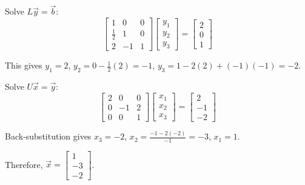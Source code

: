 \documentclass[reqno, answers]{exam}
\begin{document}
\begin{questions}
\begin{solution}
    Solve $L\vec{y} = \vec{b}$:
    $$\begin{bmatrix} 1 & 0 & 0 \\ \frac{1}{2} & 1 & 0 \\ 2 & -1 & 1 \end{bmatrix} \begin{bmatrix} y_1 \\ y_2 \\ y_3 \end{bmatrix} = \begin{bmatrix} 2 \\ 0 \\ 1 \end{bmatrix}$$
    
    This gives $y_1 = 2$, $y_2 = 0 - \frac{1}{2}(2) = -1$, $y_3 = 1 - 2(2) + (-1)(-1) = -2$.

    Solve $U\vec{x} = \vec{y}$:
    $$\begin{bmatrix} 2 & 0 & 0 \\ 0 & -1 & 2 \\ 0 & 0 & 1 \end{bmatrix} \begin{bmatrix} x_1 \\ x_2 \\ x_3 \end{bmatrix} = \begin{bmatrix} 2 \\ -1 \\ -2 \end{bmatrix}$$
    
    Back-substitution gives $x_3 = -2$, $x_2 = \frac{-1 - 2(-2)}{-1} = -3$, $x_1 = 1$.
    
    Therefore, $\vec{x} = \begin{bmatrix} 1 \\ -3 \\ -2 \end{bmatrix}$.
  \end{solution}
  \newpage


\end{questions}
\end{document}
